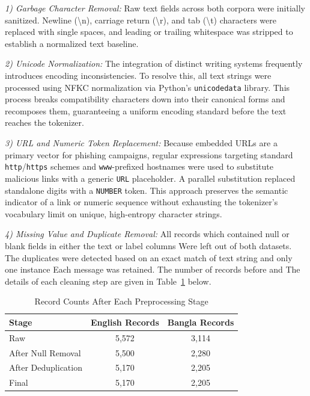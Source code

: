 \documentclass[journal]{IEEEtran}
\begin{document}
\textit{1) Garbage Character Removal:} Raw text fields across both corpora were initially sanitized. Newline (\textbackslash n), carriage return (\textbackslash r), and tab (\textbackslash t) characters were replaced with single spaces, and leading or trailing whitespace was stripped to establish a normalized text baseline.

\textit{2) Unicode Normalization:} The integration of distinct writing systems frequently introduces encoding inconsistencies. To resolve this, all text strings were processed using NFKC normalization via Python's \texttt{unicodedata} library. This process breaks compatibility characters down into their canonical forms and recomposes them, guaranteeing a uniform encoding standard before the text reaches the tokenizer.

\textit{3) URL and Numeric Token Replacement:} Because embedded URLs are a primary vector for phishing campaigns, regular expressions targeting standard \texttt{http}/\texttt{https} schemes and \texttt{www}-prefixed hostnames were used to substitute malicious links with a generic \texttt{URL} placeholder. A parallel substitution replaced standalone digits with a \texttt{NUMBER} token. This approach preserves the semantic indicator of a link or numeric sequence without exhausting the tokenizer's vocabulary limit on unique, high-entropy character strings.

\textit{4) Missing Value and Duplicate Removal:} All records which
contained null or blank fields in either the text or label columns
Were left out of both datasets. The duplicates were detected
based on an exact match of text string and only one instance
Each message was retained. The number of records before and
The details of each cleaning step are given in Table~\ref{tab:dataset_prep}
below.

\begin{table}[htbp]
\caption{Record Counts After Each Preprocessing Stage}
\label{tab:dataset_prep}
\centering
\begin{tabular}{lcc}
\toprule
\textbf{Stage} & \textbf{English Records} & \textbf{Bangla Records} \\
\midrule
Raw & 5,572 & 3,114 \\
After Null Removal & 5,500 & 2,280 \\
After Deduplication & 5,170 & 2,205 \\
Final & 5,170 & 2,205 \\
\bottomrule
\end{tabular}
\end{table}
\end{document}

